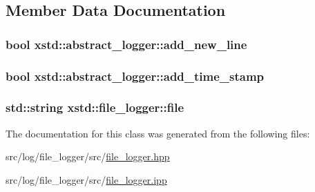 \subsection{Member Data Documentation}
\hypertarget{classxstd_1_1abstract__logger_a5216ec0a18fea2571db19d5a55d8700f}{
\subsubsection[{add\-\_\-new\-\_\-line}]{\setlength{\rightskip}{0pt plus 5cm}bool xstd\-::abstract\-\_\-logger\-::add\-\_\-new\-\_\-line\hspace{0.3cm}{\ttfamily [inherited]}}}\label{classxstd_1_1abstract__logger_a5216ec0a18fea2571db19d5a55d8700f}
\hypertarget{classxstd_1_1abstract__logger_a534b4f6a3dcdd3b7f18abfcb1bb5b937}{
\subsubsection[{add\-\_\-time\-\_\-stamp}]{\setlength{\rightskip}{0pt plus 5cm}bool xstd\-::abstract\-\_\-logger\-::add\-\_\-time\-\_\-stamp\hspace{0.3cm}{\ttfamily [inherited]}}}\label{classxstd_1_1abstract__logger_a534b4f6a3dcdd3b7f18abfcb1bb5b937}
\hypertarget{classxstd_1_1file__logger_a0745eaab93df733f6696fa14e74eb068}{
\subsubsection[{file}]{\setlength{\rightskip}{0pt plus 5cm}std\-::string xstd\-::file\-\_\-logger\-::file\hspace{0.3cm}{\ttfamily [protected]}}}\label{classxstd_1_1file__logger_a0745eaab93df733f6696fa14e74eb068}


The documentation for this class was generated from the following files\-:\begin{DoxyCompactItemize}
\item 
src/log/file\-\_\-logger/src/\hyperlink{file__logger_8hpp}{file\-\_\-logger.\-hpp}\item 
src/log/file\-\_\-logger/src/\hyperlink{file__logger_8ipp}{file\-\_\-logger.\-ipp}\end{DoxyCompactItemize}
